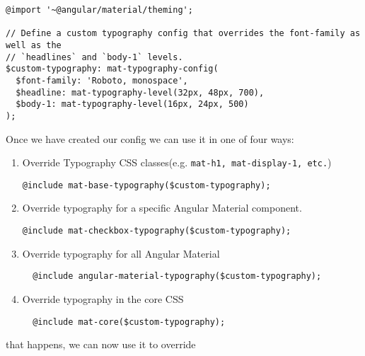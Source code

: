 \begin{lstlisting}
@import '~@angular/material/theming';

// Define a custom typography config that overrides the font-family as well as the
// `headlines` and `body-1` levels.
$custom-typography: mat-typography-config(
  $font-family: 'Roboto, monospace',
  $headline: mat-typography-level(32px, 48px, 700),
  $body-1: mat-typography-level(16px, 24px, 500)
);
\end{lstlisting}


Once we have created our config we can use it in one of four ways: 
\begin{enumerate}
\item Override Typography CSS classes(e.g. \lstinline{mat-h1, mat-display-1, etc.})
\begin{lstlisting}
@include mat-base-typography($custom-typography);
\end{lstlisting}

\item Override typography for a specific Angular Material component.
\begin{lstlisting}
@include mat-checkbox-typography($custom-typography);
\end{lstlisting}

\item Override typography for all Angular Material
\begin{lstlisting}
  @include angular-material-typography($custom-typography);
\end{lstlisting}

\item Override typography in the core CSS
\begin{lstlisting}
  @include mat-core($custom-typography);
\end{lstlisting} 
\end{enumerate}
 that happens, we can now use it to override 

